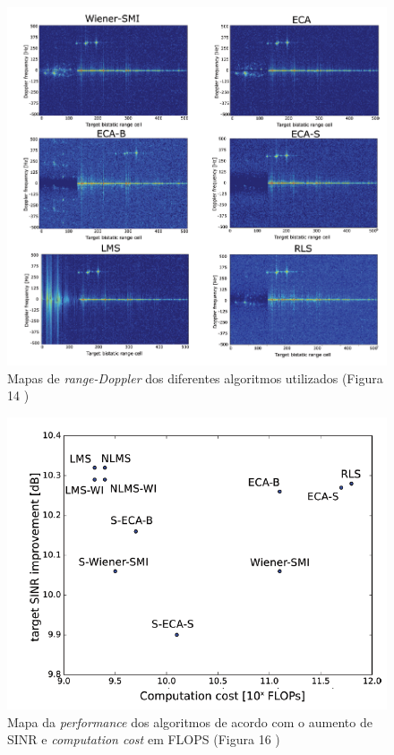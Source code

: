 \begin{figure}[h]
\centering
\includegraphics[scale=0.5]{chapters/ch2/assets/doppler_cancelationtec}
\caption[Mapas de range-Doppler dos diferentes algoritmos utilizados]{Mapas de \textit{range-Doppler} dos diferentes algoritmos utilizados (Figura 14 \cite{Peto2018})}
\label{fig:doppler_cancelationtec}
\end{figure}

\begin{figure}[h]
\centering
\includegraphics[scale=0.5]{chapters/ch2/assets/comp_cost}
\caption[Mapa da performance dos algoritmos]{Mapa da \textit{performance} dos algoritmos de acordo com o aumento de \gls{SINR} e \textit{computation cost} em \gls{FLOPS} (Figura 16 \cite{Peto2018})}
\label{fig:comp_cost}
\end{figure}

